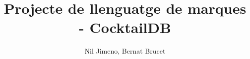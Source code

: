 

\title{\textbf{Projecte de llenguatge de marques - CocktailDB}}
\author{Nil Jimeno, Bernat Brucet}


\maketitle












\pagebreak




